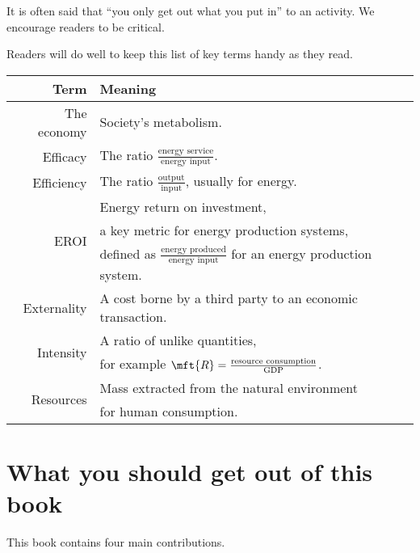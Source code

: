 {It is often said that ``you only get out what you put in'' to an activity.
We encourage readers to be critical.

Readers will do well to keep this list of key terms handy as they read.

\begin{table}[h!]
\centering
\begin{tabular}{r l}
\toprule
Term                  & Meaning      \\ 
\midrule
The economy           & Society's metabolism. \\
%
Efficacy              & The ratio $\frac{\text{energy service}}{\text{energy input}}$. \\
%
Efficiency            & The ratio $\frac{\text{output}}{\text{input}}$, usually for energy.  \\
%
\multirow{3}{*}{EROI} & Energy return on investment, \\
                      & a key metric for energy production systems, \\
                      & defined as $\frac{\text{energy produced}}{\text{energy input}}$ for an energy production system. \\
%
Externality           & A cost borne by a third party to an economic transaction. \\
%
\multirow{2}{*}{Intensity}  & A ratio of unlike quantities, \\
                            & for example $\mft{R} = \frac{\text{resource consumption}}{\text{GDP}}$. \\
%
\multirow{2}{*}{Resources}  & Mass extracted from the natural environment \\
                            & for human consumption. \\
\bottomrule
\end{tabular}
\label{tab:key_terms}
\end{table}



\section*{What you should get out of this book} 

This book contains four main contributions.

\begin{itemize}


\end{itemize}}
